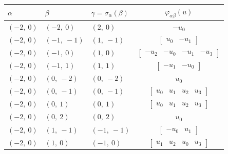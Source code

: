 \documentclass[11pt]{article}
\newcommand{\noi}{\noindent}
\theoremstyle{definition}
\begin{document}
\noi \noindent \begin{longtable}{|l|l|l|c|}
    \hline
    \textbf{$\alpha$} & \textbf{$\beta$} & \textbf{$\gamma = \sigma_{\alpha}(\beta)$} & $\varphi_{\alpha\beta}(u)$ \\
    \hline
    \endhead
    $\left( -2, \  0\right)$ & $\left( -2, \  0\right)$ & $\left( 2, \  0\right)$ & $- u_{0}$ \\
    \hline
    $\left( -2, \  0\right)$ & $\left( -1, \  -1\right)$ & $\left( 1, \  -1\right)$ & $\left[\begin{matrix}u_{0} & - u_{1}\end{matrix}\right]$ \\
    \hline
    $\left( -2, \  0\right)$ & $\left( -1, \  0\right)$ & $\left( 1, \  0\right)$ & $\left[\begin{matrix}- u_{2} & - u_{0} & - u_{1} & - u_{3}\end{matrix}\right]$ \\
    \hline
    $\left( -2, \  0\right)$ & $\left( -1, \  1\right)$ & $\left( 1, \  1\right)$ & $\left[\begin{matrix}- u_{1} & - u_{0}\end{matrix}\right]$ \\
    \hline
    $\left( -2, \  0\right)$ & $\left( 0, \  -2\right)$ & $\left( 0, \  -2\right)$ & $u_{0}$ \\
    \hline
    $\left( -2, \  0\right)$ & $\left( 0, \  -1\right)$ & $\left( 0, \  -1\right)$ & $\left[\begin{matrix}u_{0} & u_{1} & u_{2} & u_{3}\end{matrix}\right]$ \\
    \hline
    $\left( -2, \  0\right)$ & $\left( 0, \  1\right)$ & $\left( 0, \  1\right)$ & $\left[\begin{matrix}u_{0} & u_{1} & u_{2} & u_{3}\end{matrix}\right]$ \\
    \hline
    $\left( -2, \  0\right)$ & $\left( 0, \  2\right)$ & $\left( 0, \  2\right)$ & $u_{0}$ \\
    \hline
    $\left( -2, \  0\right)$ & $\left( 1, \  -1\right)$ & $\left( -1, \  -1\right)$ & $\left[\begin{matrix}- u_{0} & u_{1}\end{matrix}\right]$ \\
    \hline
    $\left( -2, \  0\right)$ & $\left( 1, \  0\right)$ & $\left( -1, \  0\right)$ & $\left[\begin{matrix}u_{1} & u_{2} & u_{0} & u_{3}\end{matrix}\right]$ \\

\end{longtable}
\end{document}
